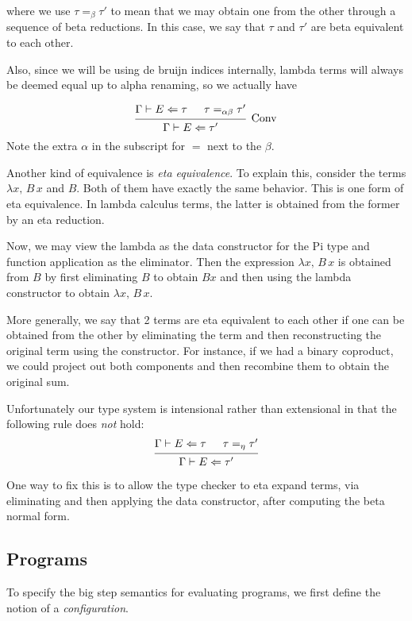 \documentclass{article}
\begin{document}
where we use $\tau =_\beta \tau'$ to mean that we may obtain one from the other
through a sequence of beta reductions. In this case, we say that $\tau$ and
$\tau'$ are beta equivalent to each other.

Also, since we will be using de bruijn indices internally, lambda terms will
always be deemed equal up to alpha renaming, so we actually have

\begin{align*}
  \begin{prooftree}
    \hypo{\Gamma \vdash E \Leftarrow \tau}
    \hypo{\tau =_{\alpha \beta} \tau'}
    \infer2[\text{Conv}]{\Gamma \vdash E \Leftarrow \tau'}
  \end{prooftree}
\end{align*}
Note the extra $\alpha$ in the subscript for $=$ next to the $\beta$.

Another kind of equivalence is \textit{eta equivalence}. To explain this,
consider the terms $\lambda x, \, B \, x$ and $B$. Both of them have exactly the
same behavior. This is one form of eta equivalence.
In lambda calculus terms, the latter is obtained from the former by an eta
reduction.

Now, we may view the lambda as the data constructor for
the Pi type and function application as the eliminator.
Then the expression $\lambda x, \, B \, x$ is obtained from $B$ by first
eliminating $B$ to obtain $B x$ and then using the lambda
constructor to obtain $\lambda x, \, B \, x$.

More generally, we say that 2 terms are eta equivalent to each other if one can
be obtained from the other by eliminating the term and then reconstructing the
original term using the constructor. For instance, if we had a binary coproduct,
we could project out both components and then recombine them to obtain the
original sum.

Unfortunately our type system is intensional rather than extensional in
that the following rule does \textit{not} hold: 
\[
  \begin{prooftree}
    \hypo{\Gamma \vdash E \Leftarrow \tau}
    \hypo{\tau =_\eta \tau'}
    \infer2{\Gamma \vdash E \Leftarrow \tau'}
  \end{prooftree}
\]

One way to fix this is to allow the type checker to eta expand terms, via
eliminating and then applying the data constructor, after
computing the beta normal form.

\subsection{Programs}
To specify the big step semantics for evaluating programs, we first define the
notion of a \textit{configuration}.
\begin{comment}
  Follows this approach:
  https://www.cs.cornell.edu/courses/cs6110/2013sp/lectures/lec05-sp13.pdf
\end{comment}
\end{document}
